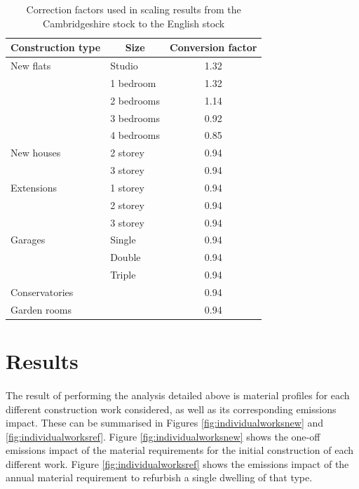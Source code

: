 \documentclass[12pt]{article}
\begin{document}
\begingroup
\linespread{1}
\begin{table}[htbp]
  \centering
  \caption{Correction factors used in scaling results from the Cambridgeshire stock to the English stock}
    \begin{tabular}{llc}
    \toprule
   \multicolumn{1}{c}{\textbf{Construction type}} &   \multicolumn{1}{c}{\textbf{Size}}    & \textbf{Conversion factor} \\
    \midrule
    New flats & Studio & 1.32 \\
          & 1 bedroom & 1.32 \\
          & 2 bedrooms & 1.14 \\
          & 3 bedrooms & 0.92 \\
          & 4 bedrooms & 0.85 \\
    New houses & 2 storey & 0.94 \\
          & 3 storey & 0.94 \\
    Extensions & 1 storey & 0.94 \\
          & 2 storey & 0.94 \\
          & 3 storey & 0.94 \\
    Garages & Single & 0.94 \\
          & Double & 0.94 \\
          & Triple & 0.94 \\
    Conservatories &       & 0.94 \\
    Garden rooms &       & 0.94 \\
    \bottomrule
    \end{tabular}%
  \label{tab:cfs}%
\end{table}%


\section{Results}
\label{results}

\paragraph{}
The result of performing the analysis detailed above is material profiles for each different construction work considered, as well as its corresponding emissions impact. These can be summarised in Figures \ref{fig:individualworksnew} and \ref{fig:individualworksref}. Figure \ref{fig:individualworksnew} shows the one-off emissions impact of the material requirements for the initial construction of each different work. Figure \ref{fig:individualworksref} shows the emissions impact of the annual material requirement to refurbish a single dwelling of that type.
\end{document}
